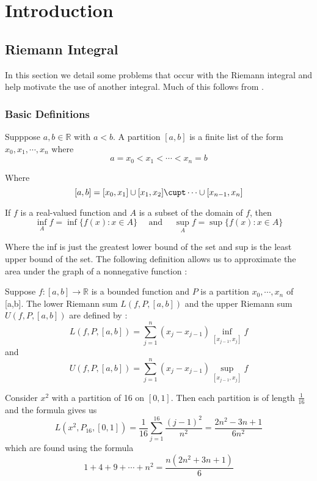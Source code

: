\chapter{Introduction}
\section{Riemann Integral}
\label{sec:Riemann Integral}
In this section we detail some problems that occur with the Riemann integral and help
motivate the use of another integral. Much of this follows from \cite{axler_measure}. 
\subsection{Basic Definitions}
\label{subsec:Basic Definitions}
\begin{defn}[Partition]
    Supppose $ a, b\in \mathbb{R}  $ with $ a < b $. A partition $ [a,b]  $ is a finite
    list of the form $ x_0, x_1, \cdots , x_n $ where 
    \[
    a = x_0 < x_1 < \cdots < x_n = b
    \]
    \label{def:Partition}
\end{defn}
Where 
\[
    [a,b] = [x_0, x_1] \cup [x_1, x_2] \cupt \cdots \cup [x_{n-1}, x_n] 
\]
\begin{defn}
    If $ f $ is a real-valued function and $ A $ is a subset of the domain of $ f $, then 
    \[
        \inf_A f = \inf \{f(x) : x \in A \} \quad \text{ and } \quad \sup_A f = \sup \{f(x) : x
        \in A\} 
    \]
    \label{def:Notation for infimum and supremum}
\end{defn}
Where the inf is just the greatest lower bound of the set and sup is the least upper bound
of the set. 
The following definition allows us to approximate the area under the graph of a
nonnegative function : 
\begin{defn}
    Suppose $ f: [a,b] \to \mathbb{R} $ is a bounded function and $ P $ is a partition $
    x_0, \cdots , x_n $ of [a,b]. The lower Riemann sum $ L\left( f, P, [a,b]\right)  $
    and the upper Riemann sum $ U\left( f, P, [a,b]\right)  $ are defined by : 
    \[
        L\left( f, P, [a,b]\right) = \sum_{j=1}^{n} \left( x_j - x_{j-1} \right)
        \inf_{[x_{j-1}, x_j]} f 
    \] and 
    \[
        U\left( f, P, [a,b]\right) = \sum_{j=1}^{n} \left( x_j - x_{j-1} \right)
        \sup_{[x_{j-1}, x_j]} f 
    \]

    \label{def:Lower and upper Riemann sums}
\end{defn}
Consider $ x^2 $ with a partition of 16 on $ [0,1] $. Then each partition is of length $
\frac{ 1 }{ 16 }  $ and the formula gives us 
\[
    L\left( x^2, P_{16}, [0,1] \right) = \frac{ 1 }{ 16  } \sum_{j=1}^{16} \frac{ \left(
    j-1\right) ^2 }{ n^2 } = \frac{ 2n^2 - 3n + 1 }{ 6n^2 } 
\]
which are found using the formula 
\[
1 + 4 + 9 + \cdots + n^2 = \frac{ n\left( 2n^2 + 3n + 1\right)  }{ 6 } 
\]
